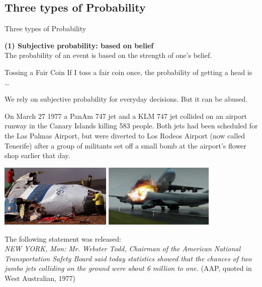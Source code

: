 \documentclass[t,xcolor=pdftex,dvipsnames,table]{beamer}\usepackage[]{graphicx}\usepackage[]{color}
\begin{document}
\subsection[]{Three types of Probability}
\begin{frame}{Three types of Probability}

{\bf (1) Subjective probability: based on belief} \\
The probability of an event is based on the strength of one’s belief.

\vspace{.5cm}
\begin{block}{Tossing a Fair Coin}
If I toss a fair coin once, the probability of getting a head is … 
\end{block}
\end{frame}


\begin{frame}{}

We rely on subjective probability for everyday decisions. But it can be abused.

\vspace{.5cm}
On March 27 1977 a PanAm 747 jet and a KLM 747 jet collided on an airport
runway in the Canary Islands killing 583 people.  Both jets had been scheduled for the Las Palmas Airport, but were diverted to Los Rodeos Airport (now called Tenerife) after  a group of militants set off a small bomb at the airport’s flower shop earlier that day. 

\begin{center}
\includegraphics[height=3cm]{../images/Canary1.jpg}
\includegraphics[height=3cm]{../images/Canary2Animation.jpg}
\end{center}
\end{frame}

\begin{frame}{}
The following statement was released: \\

\vspace{.5cm}
{\it NEW YORK, Mon: Mr. Webster Todd, Chairman
of the American National Transportation Safety Board
said today statistics showed that the chances of two
jumbo jets colliding on the ground were about 6 million
to one.} (AAP, quoted in West Australian, 1977)
\end{frame}
\end{document}
